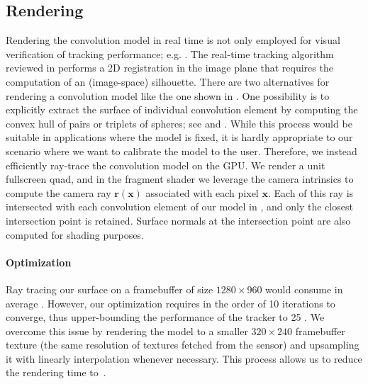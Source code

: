 \subsection{Rendering}
Rendering the convolution model in real time is not only employed for visual verification of tracking performance; e.g. . The real-time tracking algorithm reviewed in  performs a 2D registration in the image plane that requires the computation of an (image-space) silhouette. There are two alternatives for rendering a  convolution model like the one shown in . One possibility is to explicitly extract the surface of individual convolution element by computing the convex hull of pairs or triplets of spheres; see  and \cite{ando2013liquid}. While this process would be suitable in applications where the model is fixed, it is hardly appropriate to our scenario where we want to calibrate the model to the user. Therefore, we instead efficiently ray-trace the convolution model on the GPU. We render a unit fullscreen quad, and in the fragment shader we leverage the camera intrinsics to compute the camera ray $\mathbf{r}(\mathbf{x})$ associated with each pixel $\mathbf{x}$. Each of this ray is intersected with each convolution element of our model in , and only the closest intersection point is retained.  Surface normals at the intersection point are also computed for shading purposes.

\paragraph{Optimization}
Ray tracing our surface on a framebuffer of size $1280 \times 960$ would consume in average . However, our optimization requires in the order of 10 iterations to converge, thus upper-bounding the performance of the tracker to 25 \FPS{}. We overcome this issue by rendering the model to a smaller $320 \times 240$ framebuffer texture (the same resolution of textures fetched from the sensor) and upsampling it with linearly interpolation whenever necessary. This process allows us to reduce the rendering time to~.

\endinput

